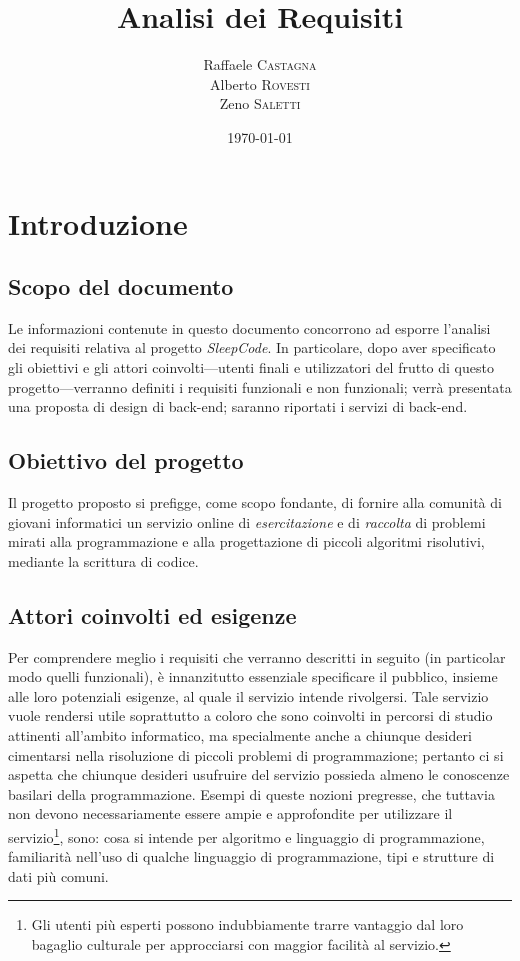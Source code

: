 \documentclass[11pt, a4paper]{article}
\title{Analisi dei Requisiti}
\author{Raffaele \textsc{Castagna}\\
Alberto \textsc{Rovesti}\\
Zeno \textsc{Saletti}}
\date{\today}
\theoremstyle{definition}
\begin{document}


\tableofcontents


\newpage
\section{Introduzione}
\subsection{Scopo del documento}
Le informazioni contenute in questo documento concorrono ad esporre l'analisi
dei requisiti relativa al progetto \textit{SleepCode}. In particolare, dopo
aver specificato gli obiettivi e gli attori coinvolti—utenti finali e
utilizzatori del frutto di questo progetto—verranno definiti i requisiti
funzionali e non funzionali; verrà presentata una proposta di design di
back-end; saranno riportati i servizi di back-end.


\subsection{Obiettivo del progetto}
Il progetto proposto si prefigge, come scopo fondante, di fornire alla comunità
di giovani informatici un servizio online di \textit{esercitazione} e di
\textit{raccolta} di problemi mirati alla programmazione e alla progettazione
di piccoli algoritmi risolutivi, mediante la scrittura di codice.

\subsection{Attori coinvolti ed esigenze}
Per comprendere meglio i requisiti che verranno descritti in seguito (in
particolar modo quelli funzionali), è innanzitutto essenziale specificare
il pubblico, insieme alle loro potenziali esigenze, al quale il servizio
intende rivolgersi.
Tale servizio vuole rendersi utile soprattutto a coloro che sono coinvolti
in percorsi di studio attinenti all'ambito informatico, ma specialmente anche
a chiunque desideri cimentarsi nella risoluzione di piccoli problemi di
programmazione; pertanto ci si aspetta che chiunque desideri usufruire del
servizio possieda almeno le conoscenze basilari della programmazione. Esempi
di queste nozioni pregresse, che tuttavia non devono necessariamente essere ampie e approfondite per utilizzare il servizio\footnote{Gli utenti più esperti possono indubbiamente trarre vantaggio dal loro bagaglio culturale per
approcciarsi con maggior facilità al servizio.}, sono: cosa si intende per
algoritmo e linguaggio di programmazione, familiarità nell'uso di qualche
linguaggio di programmazione, tipi e strutture di dati più comuni.
\end{document}
